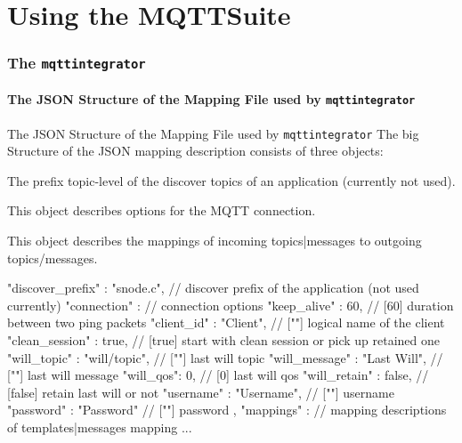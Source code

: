 ﻿\part{Using the MQTTSuite}

\section[withsectionpage]{The \texttt{mqttintegrator}}

\subsection{The \alert{JSON Structure} of the Mapping File used by \alert{\texttt{mqttintegrator}}}

\begin{frame}[fragile]{The \alert{JSON Structure} of the Mapping File used by \alert{\texttt{mqttintegrator}}}
  The big Structure of the JSON mapping description consists of three objects:
  \begin{description}
    \item[discover\_prefix] The prefix topic-level of the discover topics of an application (currently not used).
    \item[connection] This object describes options for the MQTT connection.
    \item[mappings] This object describes the mappings of incoming topics|messages to outgoing topics/messages.
  \end{description}

  \begin{jsoncode}[gobble=4]
    {
        "discover_prefix" : "snode.c",         // discover prefix of the application (not used currently)
        "connection" : {                       // connection options
            "keep_alive" : 60,                 // [60]    duration between two ping packets
            "client_id" : "Client",            // [""]    logical name of the client
            "clean_session" : true,            // [true]  start with clean session or pick up retained one
            "will_topic" : "will/topic",       // [""]    last will topic
            "will_message" : "Last Will",      // [""]    last will message
            "will_qos": 0,                     // [0]     last will qos
            "will_retain" : false,             // [false] retain last will or not
            "username" : "Username",           // [""]    username
            "password" : "Password"            // [""]    password
        },
        "mappings" : {                         // mapping descriptions of templates|messages mapping
            ...
        }
    }
  \end{jsoncode}
\end{frame}

